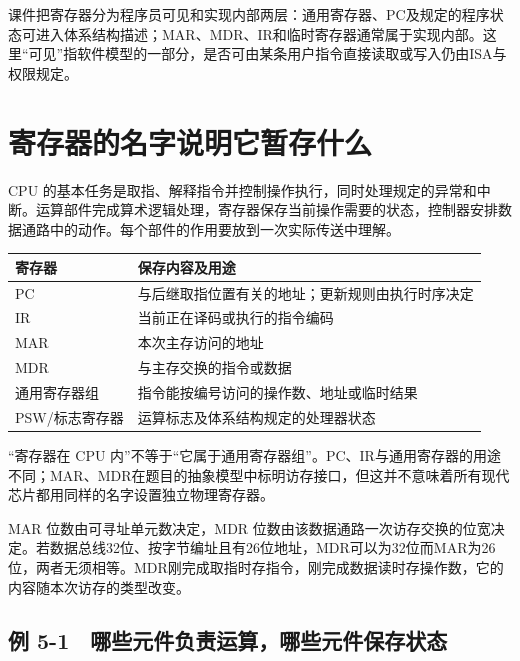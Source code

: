 课件把寄存器分为程序员可见和实现内部两层：通用寄存器、PC及规定的程序状态可进入体系结构描述；MAR、MDR、IR和临时寄存器通常属于实现内部。这里``可见''指软件模型的一部分，是否可由某条用户指令直接读取或写入仍由ISA与权限规定。

\section{寄存器的名字说明它暂存什么}\label{CO05-registers}

CPU 的基本任务是取指、解释指令并控制操作执行，同时处理规定的异常和中断。运算部件完成算术逻辑处理，寄存器保存当前操作需要的状态，控制器安排数据通路中的动作。每个部件的作用要放到一次实际传送中理解。

\par\medskip\noindent\begin{minipage}{\linewidth}\fontsize{9.3}{12}\selectfont\begin{tabularx}{\linewidth}{@{}YY@{}}
\toprule\noalign{}
寄存器 & 保存内容及用途 \\
\midrule\noalign{}


PC & 与后继取指位置有关的地址；更新规则由执行时序决定 \\
IR & 当前正在译码或执行的指令编码 \\
MAR & 本次主存访问的地址 \\
MDR & 与主存交换的指令或数据 \\
通用寄存器组 & 指令能按编号访问的操作数、地址或临时结果 \\
PSW/标志寄存器 & 运算标志及体系结构规定的处理器状态 \\
\bottomrule\end{tabularx}
\end{minipage}\par\medskip

``寄存器在 CPU 内''不等于``它属于通用寄存器组''。PC、IR与通用寄存器的用途不同；MAR、MDR在题目的抽象模型中标明访存接口，但这并不意味着所有现代芯片都用同样的名字设置独立物理寄存器。

MAR 位数由可寻址单元数决定，MDR 位数由该数据通路一次访存交换的位宽决定。若数据总线32位、按字节编址且有26位地址，MDR可以为32位而MAR为26位，两者无须相等。MDR刚完成取指时存指令，刚完成数据读时存操作数，它的内容随本次访存的类型改变。

\subsection{例 5-1　哪些元件负责运算，哪些元件保存状态}\label{CO05-example-1}

